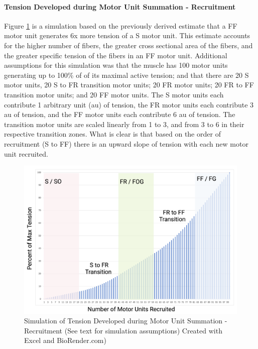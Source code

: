\paragraph{Tension Developed during Motor Unit Summation - Recruitment}

Figure \ref{fig:n_motor_unit_recruitment} is a simulation based on the previously derived estimate that a FF motor unit generates 6x more tension of a S motor unit. This estimate accounts for the higher number of fibers, the greater cross sectional area of the fibers, and the greater specific tension of the fibers in an FF motor unit. Additional assumptions for this simulation was that the muscle has 100 motor units generating up to 100\% of of its maximal active tension; and that there are 20 S motor units, 20 S to FR transition motor units; 20 FR motor units; 20 FR to FF transition motor units; and 20 FF motor units. The S motor units each contribute 1 arbitrary unit (au) of tension, the FR motor units each contribute 3 au of tension, and the FF motor units each contribute 6 au of tension. The transition motor units are scaled linearly from 1 to 3, and from 3 to 6 in their respective transition zones. What is clear is that based on the order of recruitment (S to FF) there is an upward slope of tension with each new motor unit recruited.

\begin{figure}[!ht]
    \centering
    \includegraphics[width=1\linewidth]{./figure/n_motor_unit_recruitment.png}
    \caption{Simulation of Tension Developed during Motor Unit Summation - Recruitment (See text for simulation assumptions) \footnotesize{Created with Excel and BioRender.com})}
    \label{fig:n_motor_unit_recruitment}
\end{figure}

